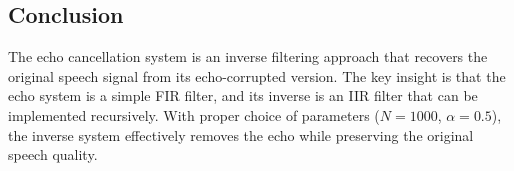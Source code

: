 \documentclass[12pt]{article}
\begin{document}
\subsection*{Conclusion}

The echo cancellation system is an inverse filtering approach that recovers the original speech signal from its echo-corrupted version. The key insight is that the echo system is a simple FIR filter, and its inverse is an IIR filter that can be implemented recursively. With proper choice of parameters (\(N = 1000\), \(\alpha = 0.5\)), the inverse system effectively removes the echo while preserving the original speech quality.
\end{document}
